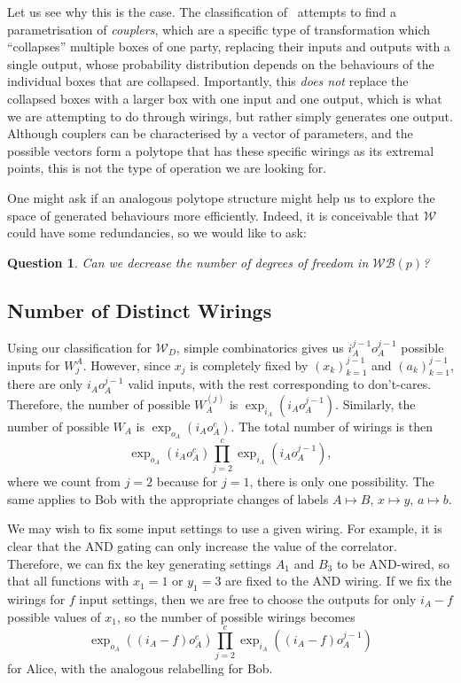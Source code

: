 \documentclass[10pt, a4paper]{article}
\numberwithin{equation}{section} %
\theoremstyle{definition}
\theoremstyle{plain}
\newtheorem{question}{Question}
\newcommand{\?}{\mathrel{?}} %
\newcommand{\sW}{\mathcal{W}}
\newcommand{\sWB}{\mathcal{WB}}
\begin{document}
      Let us see why this is the case. The classification of~\cite{ShortEntangleSwap} attempts to find a parametrisation of \emph{couplers}, which are a specific type of transformation which ``collapses'' multiple boxes of one party, replacing their inputs and outputs with a single output, whose probability distribution depends on the behaviours of the individual boxes that are collapsed. Importantly, this \emph{does not} replace the collapsed boxes with a larger box with one input and one output, which is what we are attempting to do through wirings, but rather simply generates one output. Although couplers can be characterised by a vector of parameters, and the possible vectors form a polytope that has these specific wirings as its extremal points, this is not the type of operation we are looking for.

      One might ask if an analogous polytope structure might help us to explore the space of generated behaviours more efficiently. Indeed, it is conceivable that \(\sW\) could have some redundancies, so we would like to ask:
      \begin{question}\label{qn:wirspace}
        Can we decrease the number of degrees of freedom in \(\sWB(p)\)? 
      \end{question}

      \subsection{Number of Distinct Wirings}

      Using our classification for \(\sW_D\), simple combinatorics gives us \(i_A^{j-1} o_A^{j-1}\) possible inputs for \(W_j^A\). However, since \(x_j\) is completely fixed by \({(x_k)}_{k=1}^{j-1}\) and \({(a_k)}_{k=1}^{j-1}\), there are only \(i_A o_A^{j-1}\) valid inputs, with the rest corresponding to don't-cares. Therefore, the number of possible \(W^{(j)}_A\) is \(\exp_{i_A}(i_A o_A^{j-1})\). Similarly, the number of possible \(W_A\) is \(\exp_{o_A}(i_A o_A^{c})\). The total number of wirings is then
      \begin{equation}
        \exp_{o_A}(i_A o_A^c) \prod_{j=2}^c \exp_{i_A}(i_A o_A^{j-1}),
      \end{equation}
      where we count from \(j = 2\) because for \(j = 1\), there is only one possibility. The same applies to Bob with the appropriate changes of labels \(A \mapsto B\), \(x \mapsto y\), \(a \mapsto b\). 

      We may wish to fix some input settings to use a given wiring. For example, it is clear that the AND gating can only increase the value of the correlator. Therefore, we can fix the key generating settings \(A_1\) and \(B_3\) to be AND-wired, so that all functions with \(x_1 = 1\) or \(y_1 = 3\) are fixed to the AND wiring. If we fix the wirings for \(f\) input settings, then we are free to choose the outputs for only \(i_A - f\) possible values of \(x_1\), so the number of possible wirings becomes
      \begin{equation}
        \exp_{o_A}((i_A-f) o_A^c) \prod_{j=2}^c \exp_{i_A}((i_A-f) o_A^{j-1})
      \end{equation}
      for Alice, with the analogous relabelling for Bob.
\end{document}
